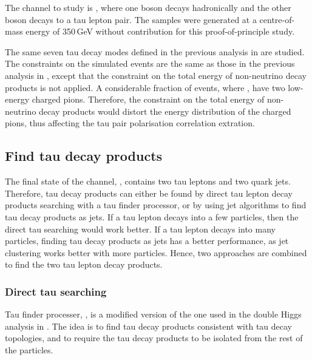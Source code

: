 The channel to study is \HepProcess{\Pep \Pem \to \PZ \PZ}, where one \PZ boson decays hadronically and the other \PZ boson decays to a tau lepton pair. The samples were generated at a centre-of-mass energy of 350\,GeV without \ISR contribution for this proof-of-principle study.

The same seven tau decay modes defined in the previous analysis in  are studied. The constraints on the simulated events are the same as those   in the previous analysis in , except that the constraint on the total energy of non-neutrino decay products is not applied. A considerable fraction of \ZToTauTau events, where \tauToPion, have two low-energy charged pions. Therefore, the constraint on the total energy of non-neutrino decay products would distort the energy distribution of the charged pions, thus affecting the tau pair polarisation correlation extration.


\subsection{Find tau decay products}
\label{sec:tauHZfindTau}

The final state of the channel, \eeZZQQ, contains two tau leptons and two quark jets. Therefore, tau decay products can either be found by direct tau lepton decay products searching with a tau finder processor, or by using jet algorithms to find tau decay products as jets. If a tau lepton decays into a few particles, then the direct tau searching would work better. If a tau lepton decays into many particles, finding tau decay products as jets has a better performance, as jet clustering works better with more particles. Hence, two approaches are combined to find the two tau lepton decay products.

\subsubsection{Direct tau searching}

Tau finder processer, \BonoTauFinder, is a modified version of the one used in the double Higgs analysis in . The idea is to find tau decay products consistent with tau decay topologies, and to require the tau  decay products to be isolated from the rest of the particles.

